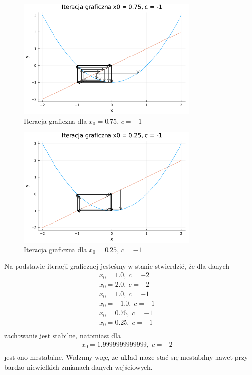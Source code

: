 \documentclass{article}
\begin{document}
\begin{figure}[H]
  \centering
  \includegraphics[width=0.8\textwidth]{../images/ex6_6.png}
  \caption{Iteracja graficzna dla $x_0=0.75$, $c=-1$}
\end{figure}
\begin{figure}[H]
  \centering
  \includegraphics[width=0.8\textwidth]{../images/ex6_7.png}
  \caption{Iteracja graficzna dla $x_0=0.25$, $c=-1$}
\end{figure}

Na podstawie iteracji graficznej jesteśmy w stanie stwierdzić,
że dla danych
\begin{gather*}
  x_0=1.0,\;c=-2\\
  x_0=2.0,\;c=-2\\
  x_0=1.0,\;c=-1\\
  x_0=-1.0,\;c=-1\\
  x_0=0.75,\;c=-1\\
  x_0=0.25,\;c=-1\\
\end{gather*}
zachowanie jest stabilne, natomiast dla
\begin{gather*}
  x_0=1.9999999999999,\;c=-2\\
\end{gather*}
jest ono niestabilne.
Widzimy więc, że układ może stać się niestabilny nawet przy bardzo
niewielkich zmianach danych wejściowych.
\end{document}
